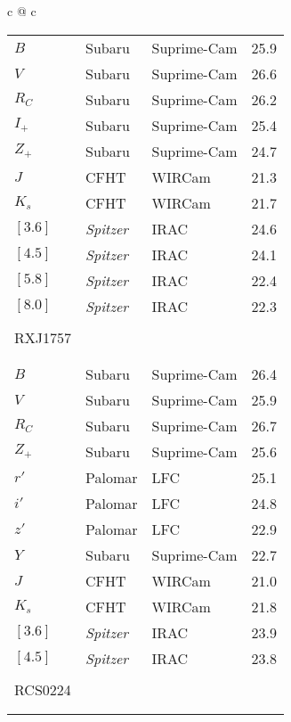 \documentclass[a4paper,fleqn,usenatbib]{mnras}
\begin{document}
\begin{table*}
\begin{center}
\begin{tabular}{c @{\hskip 15mm} c}
\begin{tabular}{llll}
		$B$    &   Subaru   &   Suprime-Cam   &   25.9   \\
		$V$    &   Subaru   &   Suprime-Cam   &   26.6   \\
		$R_C$  &   Subaru   &   Suprime-Cam   &   26.2   \\
		$I_+$  &   Subaru   &   Suprime-Cam   &   25.4   \\
		$Z_+$  &   Subaru   &   Suprime-Cam   &   24.7   \\
		$J$    &   CFHT   &   WIRCam   &   21.3   \\
		$K_s$  &   CFHT   &   WIRCam   &   21.7   \\
		$[3.6]$  &   {\it Spitzer}  &   IRAC   &   24.6   \\
		$[4.5]$  &   {\it Spitzer}  &   IRAC   &   24.1   \\
		$[5.8]$  &   {\it Spitzer}  &   IRAC   &   22.4   \\
		$[8.0]$  &   {\it Spitzer}  &   IRAC   &   22.3   \\[1mm]


		\hline \\[-3mm]
		RXJ1757 \\[-1mm]
		\hline \\[-5mm]  
		\hline \\[-2mm]

		$B$    &   Subaru   &   Suprime-Cam   &   26.4   \\
		$V$    &   Subaru   &   Suprime-Cam   &   25.9   \\
		$R_C$  &   Subaru   &   Suprime-Cam   &   26.7   \\
		$Z_+$  &   Subaru   &   Suprime-Cam   &   25.6   \\
		$r'$   &   Palomar   &   LFC   &   25.1   \\
		$i'$   &   Palomar   &   LFC   &   24.8   \\
		$z'$   &   Palomar   &   LFC   &   22.9   \\
		$Y$    &   Subaru   &   Suprime-Cam   &   22.7   \\
		$J$     &   CFHT   &   WIRCam   &   21.0   \\
		$K_s$   &   CFHT   &   WIRCam   &   21.8   \\
		$[3.6]$  &   {\it Spitzer}  &   IRAC   &  23.9    \\
		$[4.5]$  &   {\it Spitzer}  &   IRAC   &  23.8    \\[1mm]


		\hline \\[-3mm]
		RCS0224 \\[-1mm]
		\hline \\[-5mm]  
		\hline \\[-2mm]


\end{tabular}
\end{tabular}
\end{center}
\end{table*}
\end{document}

